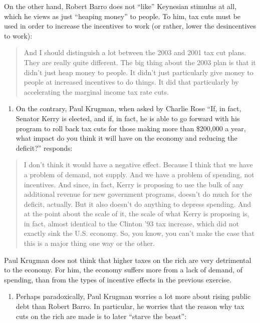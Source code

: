\documentclass[]{book}
\providecommand{\tightlist}{%
  \setlength{\itemsep}{0pt}\setlength{\parskip}{0pt}}
\begin{document}
On the other hand, Robert Barro does not ``like'' Keynesian stimulus at
all, which he views as just ``heaping money'' to people. To him, tax
cuts must be used in order to increase the incentives to work (or
rather, lower the desincentives to work):

\begin{quote}
And I should distinguish a lot between the 2003 and 2001 tax cut plans.
They are really quite different. The big thing about the 2003 plan is
that it didn't just heap money to people. It didn't just particularly
give money to people at increased incentives to do things. It did that
particularly by accelerating the marginal income tax rate cuts.
\end{quote}

\begin{enumerate}
\def\labelenumi{\arabic{enumi}.}
\setcounter{enumi}{1}
\tightlist
\item
  On the contrary, Paul Krugman, when asked by Charlie Rose ``If, in
  fact, Senator Kerry is elected, and if, in fact, he is able to go
  forward with his program to roll back tax cuts for those making more
  than \$200,000 a year, what impact do you think it will have on the
  economy and reducing the deficit?'' responds:
\end{enumerate}

\begin{quote}
I don't think it would have a negative effect. Because I think that we
have a problem of demand, not supply. And we have a problem of spending,
not incentives. And since, in fact, Kerry is proposing to use the bulk
of any additional revenue for new government programs, doesn't do much
for the deficit, actually. But it also doesn't do anything to depress
spending. And at the point about the scale of it, the scale of what
Kerry is proposing is, in fact, almost identical to the Clinton '93 tax
increase, which did not exactly sink the U.S. economy. So, you know, you
can't make the case that this is a major thing one way or the other.
\end{quote}

Paul Krugman does not think that higher taxes on the rich are very
detrimental to the economy. For him, the economy suffers more from a
lack of demand, of spending, than from the types of incentive effects in
the previous exercise.

\begin{enumerate}
\def\labelenumi{\arabic{enumi}.}
\setcounter{enumi}{2}
\tightlist
\item
  Perhaps paradoxically, Paul Krugman worries a lot more about rising
  public debt than Robert Barro. In particular, he worries that the
  reason why tax cuts on the rich are made is to later ``starve the
  beast'':
\end{enumerate}
\end{document}
